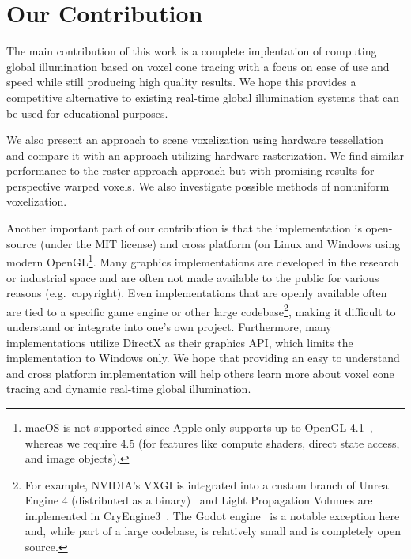 \section{Our Contribution}
The main contribution of this work is a complete implentation of computing global illumination based on voxel cone tracing with a focus on ease of use and speed while still producing high quality results. We hope this provides a competitive alternative to existing real-time global illumination systems that can be used for educational purposes.

 We also present an approach to scene voxelization using hardware tessellation and compare it with an approach utilizing hardware rasterization. We find similar performance to the raster approach approach but with promising results for perspective warped voxels. We also investigate possible methods of nonuniform voxelization.


Another important part of our contribution is that the implementation is open-source (under the MIT license) and cross platform (on Linux and Windows using modern OpenGL\footnote{macOS is not supported since Apple only supports up to OpenGL 4.1~\cite{appleopenglsupport}, whereas we require 4.5 (for features like compute shaders, direct state access, and image objects).}. Many graphics implementations are developed in the research or industrial space and are often not made available to the public for various reasons (e.g.\ copyright). Even implementations that are openly available often are tied to a specific game engine or other large codebase\footnote{For example, NVIDIA's VXGI is integrated into a custom branch of Unreal Engine 4 (distributed as a binary)~\cite{nvidiavxgi} and Light Propagation Volumes are implemented in CryEngine3~\cite{kaplanyan2009light}. The Godot engine~\cite{godotengine} is a notable exception here and, while part of a large codebase, is relatively small and is completely open source.}, making it difficult to understand or integrate into one's own project. Furthermore, many implementations utilize DirectX as their graphics API, which limits the implementation to Windows only. We hope that providing an easy to understand and cross platform implementation will help others learn more about voxel cone tracing and dynamic real-time global illumination.
